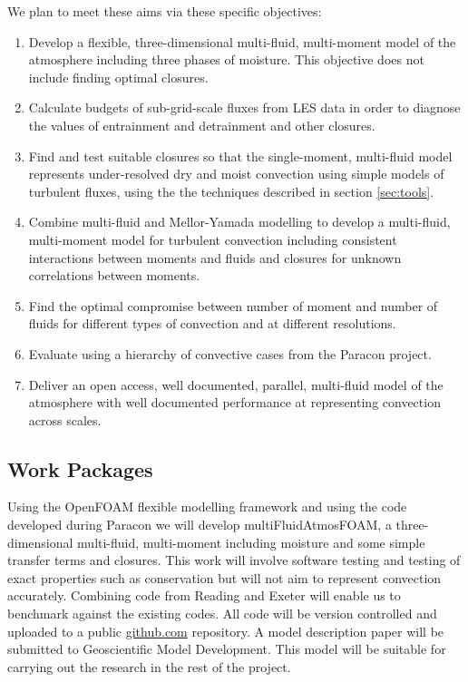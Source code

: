 \documentclass[11pt,a4paper]{article}
\begin{document}
We plan to meet these aims via these specific objectives:

\begin{enumerate}
\item\label{it:model} Develop a flexible, three-dimensional multi-fluid, multi-moment model of the atmosphere including three phases of moisture. This objective does not include finding optimal closures.

\item\label{it:budgets} Calculate budgets of sub-grid-scale fluxes from LES data in order to diagnose the values of entrainment and detrainment and other closures.

\item Find and test suitable closures so that the single-moment, multi-fluid model represents under-resolved dry and moist convection using simple models of turbulent fluxes, using the the techniques described in section \ref{sec:tools}.

\item Combine multi-fluid and Mellor-Yamada modelling to develop a  multi-fluid, multi-moment model for turbulent convection including consistent interactions between moments and fluids and closures for unknown correlations between moments.

\item Find the optimal compromise between number of moment and number of fluids for different types of convection and at different resolutions.

\item Evaluate using a hierarchy of convective cases from the Paracon project.

\item Deliver an open access, well documented, parallel, multi-fluid model of the atmosphere with well documented performance at representing convection across scales.
\end{enumerate}

\subsection{Work Packages}
\label{sec:WPs}


Using the OpenFOAM flexible modelling framework and using the code developed during Paracon we will develop multiFluidAtmosFOAM, a three-dimensional multi-fluid, multi-moment including moisture and some simple transfer terms and closures. This work will involve software testing and testing of exact properties such as conservation but will not aim to represent convection accurately. Combining code from Reading and Exeter will enable us to benchmark against the existing codes. All code will be version controlled and uploaded to a public \url{github.com} repository. A model description paper will be submitted to Geoscientific Model Development. This model will be suitable for carrying out the research in the rest of the project. 
\end{document}
